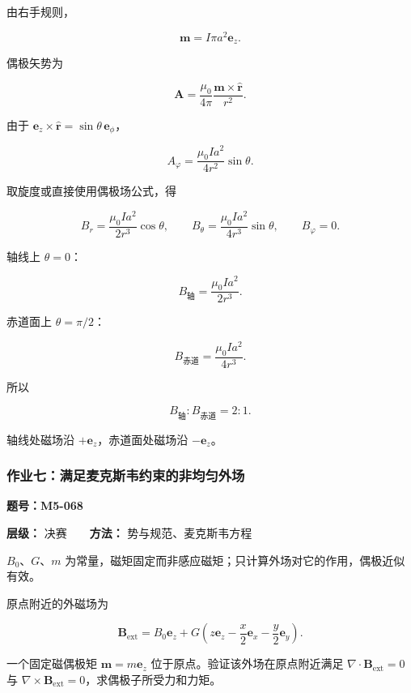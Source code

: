 由右手规则，

\[
\mathbf m=I\pi a^2\mathbf e_z.
\]

偶极矢势为

\[
\mathbf A
=\frac{\mu_0}{4\pi}
\frac{\mathbf m\times\hat{\mathbf r}}{r^2}.
\]

由于 \(\mathbf e_z\times\hat{\mathbf r}=\sin\theta\,\mathbf e_{\phi}\)，

\[
\boxed{
A_{\varphi}=\frac{\mu_0Ia^2}{4r^2}\sin\theta
}.
\]

取旋度或直接使用偶极场公式，得

\[
\boxed{
B_r=\frac{\mu_0Ia^2}{2r^3}\cos\theta,
\qquad
B_{\theta}=\frac{\mu_0Ia^2}{4r^3}\sin\theta,
\qquad
B_{\varphi}=0
}.
\]

轴线上 \(\theta=0\)：

\[
B_{\mathrm{\text{轴}}}=\frac{\mu_0Ia^2}{2r^3}.
\]

赤道面上 \(\theta=\pi/2\)：

\[
B_{\mathrm{\text{赤道}}}=\frac{\mu_0Ia^2}{4r^3}.
\]

所以

\[
\boxed{B_{\mathrm{\text{轴}}}:B_{\mathrm{\text{赤道}}}=2:1}.
\]

轴线处磁场沿 \(+\mathbf e_z\)，赤道面处磁场沿 \(-\mathbf e_z\)。

\par{}
\noindent\begin{minipage}{\linewidth}

\subsubsection{作业七：满足麦克斯韦约束的非均匀外场}\label{m5:ux4f5cux4e1aux4e03ux6ee1ux8db3ux9ea6ux514bux65afux97e6ux7ea6ux675fux7684ux975eux5747ux5300ux5916ux573a}

\textbf{题号：M5-068}

\textbf{层级：} 决赛　　\textbf{方法：} 势与规范、麦克斯韦方程

\(B_0\text{、}G\text{、}m\)
为常量，磁矩固定而非感应磁矩；只计算外场对它的作用，偶极近似有效。

原点附近的外磁场为

\[
\mathbf B_{\mathrm{ext}}
=B_0\mathbf e_z
+G\left(z\mathbf e_z-\frac{x}{2}\mathbf e_x-\frac{y}{2}\mathbf e_y\right).
\]

一个固定磁偶极矩 \(\mathbf m=m\mathbf e_z\)
位于原点。验证该外场在原点附近满足
\(\nabla\cdot\mathbf B_{\mathrm{ext}}=0\) 与
\(\nabla\times\mathbf B_{\mathrm{ext}}=0\)，求偶极子所受力和力矩。

\end{minipage}\par

